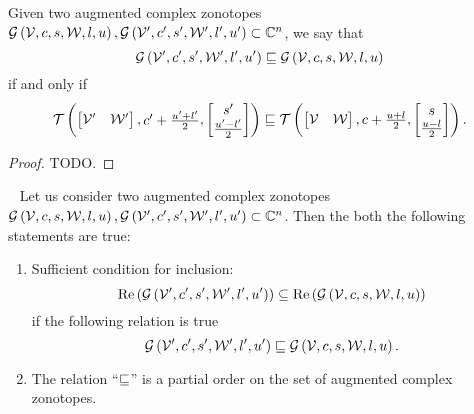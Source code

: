 \begin{definition}
Given two augmented complex zonotopes $\mathcal{G}\left(\mathcal{V},c,s,\mathcal{W},l,u\right),
\mathcal{G}\left(\mathcal{V}^\prime,c^\prime,s^\prime,\mathcal{W}^\prime,l^\prime,u^\prime\right)\subset\mathbb{C}^n$,
we say that
%
\[
\mathcal{G}\left(\mathcal{V}^\prime,c^\prime,s^\prime,\mathcal{W}^\prime,l^\prime,u^\prime\right) \sqsubseteq
 \mathcal{G}\left(\mathcal{V},c,s,\mathcal{W},l,u\right)
\]
%
if and only if
%
\[
\mathit{\operatorname{\mathcal{T}}}\left(\left[\begin{matrix}
      \mathcal{V}^\prime &
      \mathcal{W}^\prime
    \end{matrix}\right]
  ,\begin{matrix}
      c^\prime+\frac{u^\prime+l^\prime}{2}
    \end{matrix}
  ,\left[\begin{matrix}
      s^\prime\\
      \frac{u^\prime-l^\prime}{2}
    \end{matrix}\right]
  \right)  
  \sqsubseteq
  \mathit{\operatorname{\mathcal{T}}}\left(\left[\begin{matrix}
      \mathcal{V} &
      \mathcal{W}
    \end{matrix}\right]
  ,\begin{matrix}
      c+\frac{u+l}{2}
    \end{matrix}
  ,\left[\begin{matrix}
      s\\
      \frac{u-l}{2}
    \end{matrix}\right]
  \right).
\]
%
\end{definition}
%
\begin{proof}
{\color{red} TODO}.
\end{proof}
%
\begin{theorem}~\label{thm:acz-inclusion}
Let us consider two augmented complex zonotopes $\mathcal{G}\left(\mathcal{V},c,s,\mathcal{W},l,u\right),
\mathcal{G}\left(\mathcal{V}^\prime,c^\prime,s^\prime,\mathcal{W}^\prime,l^\prime,u^\prime\right)\subset\mathbb{C}^n$.
Then the both the following statements are true:
\begin{enumerate}
  \item Sufficient condition for inclusion:
%
\[
\operatorname{Re}\left(\mathcal{G}\left(\mathcal{V}^\prime,c^\prime,s^\prime,\mathcal{W}^\prime,l^\prime,u^\prime\right)\right)\subseteq\operatorname{Re}\left(\mathcal{G}\left(\mathcal{V},c,s,\mathcal{W},l,u\right)\right)
\]
%
if the following relation is true
%
\[
\mathcal{G}\left(\mathcal{V}^\prime,c^\prime,s^\prime,\mathcal{W}^\prime,l^\prime,u^\prime\right)\sqsubseteq\mathcal{G}\left(\mathcal{V},c,s,\mathcal{W},l,u\right).
\]
%
\item The relation ``$\sqsubseteq$'' is a partial order on the set of
  augmented complex zonotopes.
\end{enumerate}
%
\end{theorem}
